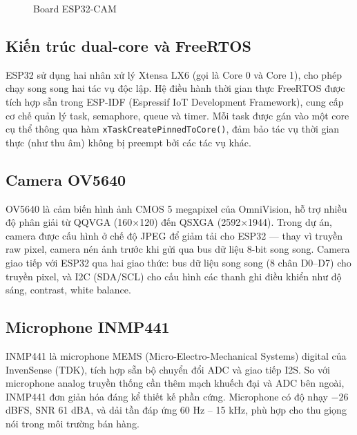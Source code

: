 \begin{figure}[htbp]
\centering
{}
\caption{Board ESP32-CAM}
\label{fig:esp32-cam-board}
\end{figure}

\subsection{Kiến trúc dual-core và FreeRTOS}

ESP32 sử dụng hai nhân xử lý Xtensa LX6 (gọi là Core 0 và Core 1),
cho phép chạy song song hai tác vụ độc lập. Hệ điều hành thời gian thực
FreeRTOS được tích hợp sẵn trong ESP-IDF (Espressif IoT Development Framework),
cung cấp cơ chế quản lý task, semaphore, queue và timer. Mỗi task được gán
vào một core cụ thể thông qua hàm \texttt{xTaskCreatePinnedToCore()}, đảm bảo
tác vụ thời gian thực (như thu âm) không bị preempt bởi các tác vụ khác.

\subsection{Camera OV5640}

OV5640 là cảm biến hình ảnh CMOS 5 megapixel của OmniVision, hỗ trợ nhiều
độ phân giải từ QQVGA (160$\times$120) đến QSXGA (2592$\times$1944).
Trong dự án, camera được cấu hình ở chế độ JPEG để giảm tải cho ESP32 ---
thay vì truyền raw pixel, camera nén ảnh trước khi gửi qua bus dữ liệu 8-bit
song song. Camera giao tiếp với ESP32 qua hai giao thức: bus dữ liệu song song
(8 chân D0--D7) cho truyền pixel, và I2C (SDA/SCL) cho cấu hình các thanh ghi
điều khiển như độ sáng, contrast, white balance.

\subsection{Microphone INMP441}

INMP441 là microphone MEMS (Micro-Electro-Mechanical Systems) digital của
InvenSense (TDK), tích hợp sẵn bộ chuyển đổi ADC và giao tiếp I2S. So với
microphone analog truyền thống cần thêm mạch khuếch đại và ADC bên ngoài,
INMP441 đơn giản hóa đáng kể thiết kế phần cứng. Microphone có độ nhạy
$-26$ dBFS, SNR 61 dBA, và dải tần đáp ứng 60 Hz -- 15 kHz, phù hợp cho
thu giọng nói trong môi trường bán hàng.


